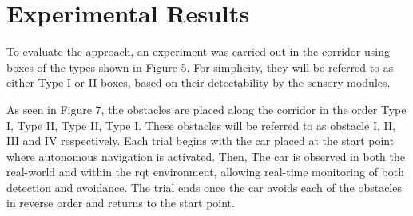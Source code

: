 \documentclass[conference]{IEEEtran}
\begin{document}










\section{Experimental Results}
To evaluate the approach, an experiment was carried out in the corridor using boxes of the types shown in Figure 5. For simplicity, they will be referred to as either Type I or II boxes, based on their detectability by the sensory modules.


As seen in Figure 7, the obstacles are placed along the corridor in the order Type I, Type II, Type II, Type I. These obstacles will be referred to as obstacle I, II, III and IV respectively. Each trial begins with the car placed at the start point where autonomous navigation is activated. Then, The car is observed in both the real-world and within the rqt environment, allowing real-time monitoring of both detection and avoidance. The trial ends once the car avoids each of the obstacles in reverse order and returns to the start point. 
\end{document}
